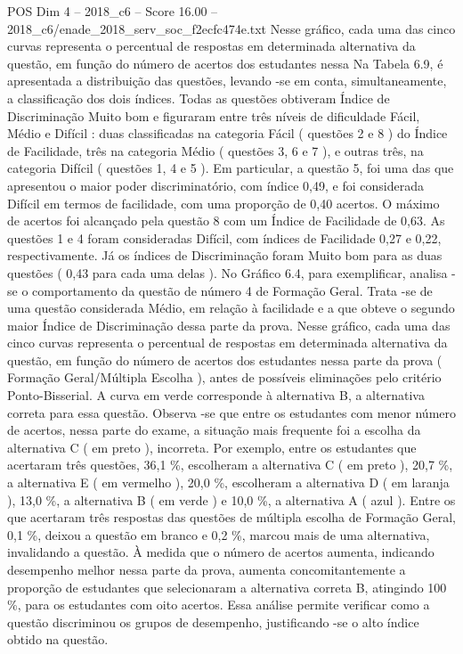 \begin{textsample}{POS Dim 4 – 2018\_c6 – Score 16.00 – 2018\_c6/enade\_2018\_serv\_soc\_f2ecfc474e.txt}
Nesse gráfico, cada uma das cinco curvas representa o percentual de respostas em determinada alternativa da questão, em função do número de acertos dos estudantes nessa Na Tabela 6.9, é apresentada a distribuição das questões, levando -se em conta, simultaneamente, a classificação dos dois índices.
Todas as questões obtiveram Índice de Discriminação Muito bom e figuraram entre três níveis de dificuldade Fácil, Médio e Difícil : duas classificadas na categoria Fácil ( questões 2 e 8 ) do Índice de Facilidade, três na categoria Médio ( questões 3, 6 e 7 ), e outras três, na categoria Difícil ( questões 1, 4 e 5 ).
Em particular, a questão 5, foi uma das que apresentou o maior poder discriminatório, com índice 0,49, e foi considerada Difícil em termos de facilidade, com uma proporção de 0,40 acertos.
O máximo de acertos foi alcançado pela questão 8 com um Índice de Facilidade de 0,63.
As questões 1 e 4 foram consideradas Difícil, com índices de Facilidade 0,27 e 0,22, respectivamente.
Já os índices de Discriminação foram Muito bom para as duas questões ( 0,43 para cada uma delas ).
No Gráfico 6.4, para exemplificar, analisa -se o comportamento da questão de número 4 de Formação Geral.
Trata -se de uma questão considerada Médio, em relação à facilidade e a que obteve o segundo maior Índice de Discriminação dessa parte da prova.
Nesse gráfico, cada uma das cinco curvas representa o percentual de respostas em determinada alternativa da questão, em função do número de acertos dos estudantes nessa parte da prova ( Formação Geral/Múltipla Escolha ), antes de possíveis eliminações pelo critério Ponto-Bisserial.
A curva em verde corresponde à alternativa B, a alternativa correta para essa questão.
Observa -se que entre os estudantes com menor número de acertos, nessa parte do exame, a situação mais frequente foi a escolha da alternativa C ( em preto ), incorreta.
Por exemplo, entre os estudantes que acertaram três questões, 36,1 \%, escolheram a alternativa C ( em preto ), 20,7 \%, a alternativa E ( em vermelho ), 20,0 \%, escolheram a alternativa D ( em laranja ), 13,0 \%, a alternativa B ( em verde ) e 10,0 \%, a alternativa A ( azul ).
Entre os que acertaram três respostas das questões de múltipla escolha de Formação Geral, 0,1 \%, deixou a questão em branco e 0,2 \%, marcou mais de uma alternativa, invalidando a questão.
À medida que o número de acertos aumenta, indicando desempenho melhor nessa parte da prova, aumenta concomitantemente a proporção de estudantes que selecionaram a alternativa correta B, atingindo 100 \%, para os estudantes com oito acertos.
Essa análise permite verificar como a questão discriminou os grupos de desempenho, justificando -se o alto índice obtido na questão.

\end{textsample}
